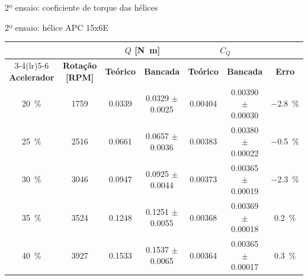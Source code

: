 \begin{frame}{2º ensaio: coeficiente de torque das hélices}
  \centering
  \begin{fundobranco}
    \hspace{0.8cm}%
  \end{fundobranco}
\end{frame}

\begin{frame}{2º ensaio: hélice APC 15x6E}
  \centering
  \begin{fundobranco}
  \begin{tabular}{ccccccc}
    \toprule
    & & \multicolumn{2}{c}{\textbf{$Q$ [\si{\newton\meter}]}} & \multicolumn{2}{c}{\textbf{$C_Q$}} & \\
    \cmidrule(lr){3-4}\cmidrule(lr){5-6}
    \textbf{Acelerador} & \textbf{Rotação [RPM]} & \textbf{Teórico} & \textbf{Bancada} & \textbf{Teórico} & \textbf{Bancada} & \textbf{Erro} \\
    \midrule
    \SI{20}{\percent} & \num{1759} & \num{0,0339} & \num{0,0329} $\pm$ \num{0,0025} & \num{0,00404} & \num{0,00390} $\pm$ \num{0,00030} & \SI{-2,8}{\percent} \\
    \SI{25}{\percent} & \num{2516} & \num{0,0661} & \num{0,0657} $\pm$ \num{0,0036} & \num{0,00383} & \num{0,00380} $\pm$ \num{0,00022} & \SI{-0,5}{\percent} \\
    \SI{30}{\percent} & \num{3046} & \num{0,0947} & \num{0,0925} $\pm$ \num{0,0044} & \num{0,00373} & \num{0,00365} $\pm$ \num{0,00019} & \SI{-2,3}{\percent} \\
    \SI{35}{\percent} & \num{3524} & \num{0,1248} & \num{0,1251} $\pm$ \num{0,0055} & \num{0,00368} & \num{0,00369} $\pm$ \num{0,00018} & \SI{+0,2}{\percent} \\
    \SI{40}{\percent} & \num{3927} & \num{0,1533} & \num{0,1537} $\pm$ \num{0,0065} & \num{0,00364} & \num{0,00365} $\pm$ \num{0,00017} & \SI{+0,3}{\percent} \\
    \bottomrule
  \end{tabular}
  \end{fundobranco}
\end{frame}

